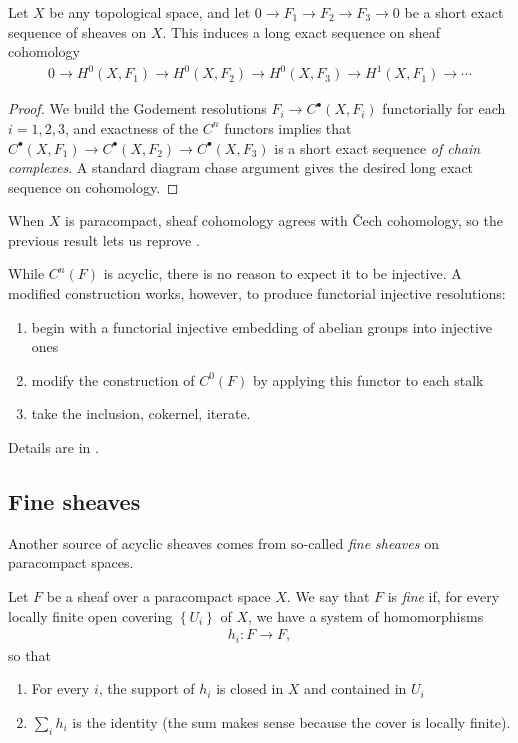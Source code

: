 \documentclass[11pt]{book}
\begin{document}
\begin{proposition}\label{prop:LES-sheaf-cohomology-any-space} Let $X$ be any topological space, and let $0 \to F_1 \to F_2 \to F_3 \to 0$ be a short exact sequence of sheaves on $X$. This induces a long exact sequence on sheaf cohomology
\begin{align*}
    0 \to H^0(X,F_1) \to H^0(X,F_2) \to H^0(X,F_3) \to H^1(X,F_1) \to \cdots
\end{align*}
\end{proposition}
\begin{proof} We build the Godement resolutions $F_i \to C^\bullet(X,F_i)$ functorially for each $i=1,2,3$, and exactness of the $C^n$ functors implies that $C^\bullet(X,F_1) \to C^\bullet(X,F_2) \to C^\bullet(X,F_3)$ is a short exact sequence \emph{of chain complexes}. A standard diagram chase argument gives the desired long exact sequence on cohomology.
\end{proof}

When $X$ is paracompact, sheaf cohomology agrees with \v{C}ech cohomology, so the previous result lets us reprove .

\begin{remark} While $C^n(F)$ is acyclic, there is no reason to expect it to be injective. A modified construction works, however, to produce functorial injective resolutions:
\begin{enumerate}
    \item begin with a functorial injective embedding of abelian groups into injective ones
    \item modify the construction of $C^0(F)$ by applying this functor to each stalk
    \item take the inclusion, cokernel, iterate.
\end{enumerate}
Details are in \cite[01DG]{Stacks}.
\end{remark}


\subsection{Fine sheaves}

Another source of acyclic sheaves comes from so-called \emph{fine sheaves} on paracompact spaces.

\begin{definition}\label{def:fine-sheaf} 
Let $F$ be a sheaf over a paracompact space $X$. We say that $F$ is \emph{fine} if, for every locally finite open covering $\left\{ U_i \right\}$ of $X$, we have a system of homomorphisms
\begin{align*}
    h_i \colon F \to F,
\end{align*}
so that
\begin{enumerate}
    \item For every $i$, the support of $h_i$ is closed in $X$ and contained in $U_i$
    \item $\sum_i h_i$ is the identity (the sum makes sense because the cover is locally finite).
\end{enumerate}
\end{definition}
\end{document}
